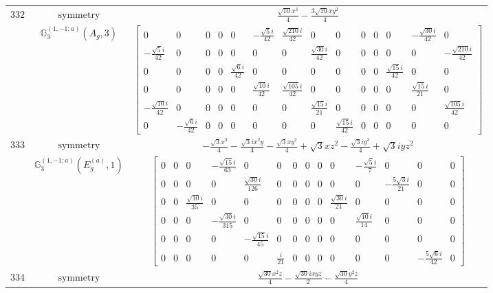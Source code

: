 \documentclass[fleqn,8pt,landscape]{jsarticle}
\begin{document}
\begin{longtable}{ccc}
$ 332 $ & $ \text{symmetry} $ & $ \frac{\sqrt{10} x^{3}}{4} - \frac{3 \sqrt{10} x y^{2}}{4} $ \\
$  $ & $ \mathbb{G}_{3}^{(1,-1;a)}(A_{g},3) $ & $ \begin{bmatrix} 0 & 0 & 0 & 0 & 0 & - \frac{\sqrt{5} i}{42} & \frac{\sqrt{210} i}{42} & 0 & 0 & 0 & 0 & 0 & - \frac{\sqrt{30} i}{42} & 0 \\ - \frac{\sqrt{5} i}{42} & 0 & 0 & 0 & 0 & 0 & 0 & \frac{\sqrt{30} i}{42} & 0 & 0 & 0 & 0 & 0 & - \frac{\sqrt{210} i}{42} \\ 0 & 0 & 0 & 0 & \frac{\sqrt{6} i}{42} & 0 & 0 & 0 & 0 & 0 & 0 & \frac{\sqrt{15} i}{42} & 0 & 0 \\ 0 & 0 & 0 & 0 & 0 & \frac{\sqrt{10} i}{42} & \frac{\sqrt{105} i}{42} & 0 & 0 & 0 & 0 & 0 & \frac{\sqrt{15} i}{21} & 0 \\ - \frac{\sqrt{10} i}{42} & 0 & 0 & 0 & 0 & 0 & 0 & \frac{\sqrt{15} i}{21} & 0 & 0 & 0 & 0 & 0 & \frac{\sqrt{105} i}{42} \\ 0 & - \frac{\sqrt{6} i}{42} & 0 & 0 & 0 & 0 & 0 & 0 & \frac{\sqrt{15} i}{42} & 0 & 0 & 0 & 0 & 0 \end{bmatrix} $ \\ \hline
$ 333 $ & $ \text{symmetry} $ & $ - \frac{\sqrt{3} x^{3}}{4} - \frac{\sqrt{3} i x^{2} y}{4} - \frac{\sqrt{3} x y^{2}}{4} + \sqrt{3} x z^{2} - \frac{\sqrt{3} i y^{3}}{4} + \sqrt{3} i y z^{2} $ \\
$  $ & $ \mathbb{G}_{3}^{(1,-1;a)}(E_{g}^{(a)},1) $ & $ \begin{bmatrix} 0 & 0 & 0 & - \frac{\sqrt{15} i}{63} & 0 & 0 & 0 & 0 & 0 & 0 & - \frac{\sqrt{5} i}{7} & 0 & 0 & 0 \\ 0 & 0 & 0 & 0 & \frac{\sqrt{30} i}{126} & 0 & 0 & 0 & 0 & 0 & 0 & - \frac{5 \sqrt{3} i}{21} & 0 & 0 \\ 0 & 0 & \frac{\sqrt{10} i}{35} & 0 & 0 & 0 & 0 & 0 & 0 & \frac{\sqrt{30} i}{21} & 0 & 0 & 0 & 0 \\ 0 & 0 & 0 & - \frac{\sqrt{30} i}{315} & 0 & 0 & 0 & 0 & 0 & 0 & \frac{\sqrt{10} i}{14} & 0 & 0 & 0 \\ 0 & 0 & 0 & 0 & - \frac{\sqrt{15} i}{45} & 0 & 0 & 0 & 0 & 0 & 0 & 0 & 0 & 0 \\ 0 & 0 & 0 & 0 & 0 & \frac{i}{21} & 0 & 0 & 0 & 0 & 0 & 0 & - \frac{5 \sqrt{6} i}{42} & 0 \end{bmatrix} $ \\ \hline
$ 334 $ & $ \text{symmetry} $ & $ \frac{\sqrt{30} x^{2} z}{4} - \frac{\sqrt{30} i x y z}{2} - \frac{\sqrt{30} y^{2} z}{4} $ \\

\end{longtable}
\end{document}
